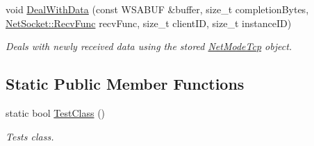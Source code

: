 \begin{DoxyCompactItemize}
void \hyperlink{class_net_socket_t_c_p_a33a379bcc79c7c2631be6bea0ac13ce3}{DealWithData} (const WSABUF \&buffer, size\_\-t completionBytes, \hyperlink{class_net_socket_a52b5f4de8d0a47fd8620f542b21c076c}{NetSocket::RecvFunc} recvFunc, size\_\-t clientID, size\_\-t instanceID)
\begin{DoxyCompactList}\small\item\em Deals with newly received data using the stored \hyperlink{class_net_mode_tcp}{NetModeTcp} object. \item\end{DoxyCompactList}\end{DoxyCompactItemize}
\subsection*{Static Public Member Functions}
\begin{DoxyCompactItemize}
\item 
static bool \hyperlink{class_net_socket_t_c_p_a844311ce7f1248d66b4e15d9e042e89a}{TestClass} ()
\begin{DoxyCompactList}\small\item\em Tests class. \item\end{DoxyCompactList}\end{DoxyCompactItemize}
